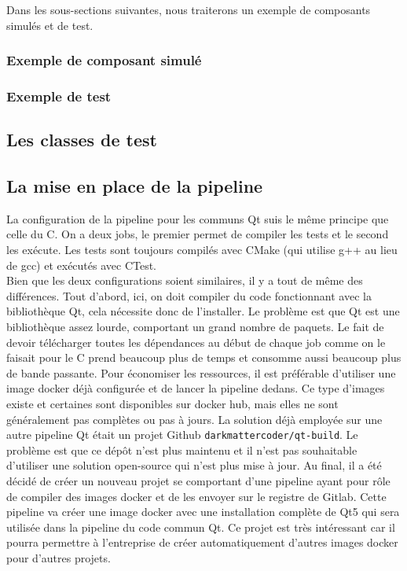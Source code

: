 \documentclass[a4paper]{article}
\begin{document}
Dans les sous-sections suivantes, nous traiterons un exemple de composants
simulés et de test.

\subsubsection{Exemple de composant simulé}

\subsubsection{Exemple de test}

\subsection{Les classes de test}

\subsection{La mise en place de la pipeline}

La configuration de la pipeline pour les communs Qt suis le même principe que
celle du C. On a deux jobs, le premier permet de compiler les tests et le second
les exécute. Les tests sont toujours compilés avec CMake (qui utilise g++ au
lieu de gcc) et exécutés avec CTest.\\

Bien que les deux configurations soient similaires, il y a tout de même des
différences. Tout d'abord, ici, on doit compiler du code fonctionnant avec la
bibliothèque Qt, cela nécessite donc de l'installer. Le problème est que Qt est
une bibliothèque assez lourde, comportant un grand nombre de paquets. Le fait de
devoir télécharger toutes les dépendances au début de chaque job comme on le
faisait pour le C prend beaucoup plus de temps et consomme aussi beaucoup plus
de bande passante. Pour économiser les ressources, il est préférable d'utiliser
une image docker déjà configurée et de lancer la pipeline dedans. Ce type
d'images existe et certaines sont disponibles sur docker hub, mais elles ne sont
généralement pas complètes ou pas à jours. La solution déjà employée sur une
autre pipeline Qt était un projet Github \verb|darkmattercoder/qt-build|. Le
problème est que ce dépôt n'est plus maintenu et il n'est pas souhaitable
d'utiliser une solution open-source qui n'est plus mise à jour. Au final, il a
été décidé de créer un nouveau projet se comportant d'une pipeline ayant pour
rôle de compiler des images docker et de les envoyer sur le registre de Gitlab.
Cette pipeline va créer une image docker avec une installation complète de Qt5
qui sera utilisée dans la pipeline du code commun Qt. Ce projet est très
intéressant car il pourra permettre à l'entreprise de créer automatiquement
d'autres images docker pour d'autres projets.
\end{document}
